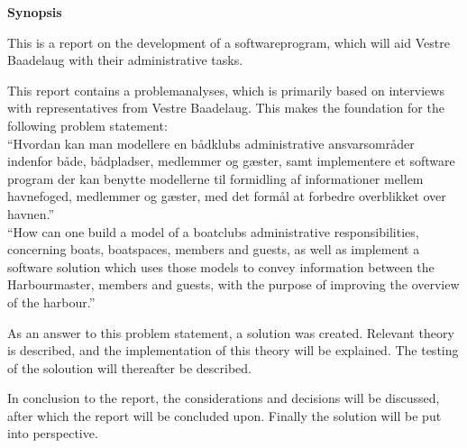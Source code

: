\begin{center}\textbf{Synopsis}\\ \end{center}

This is a report on the development of a softwareprogram, which will aid Vestre Baadelaug with their administrative tasks.

This report contains a problemanalyses, which is primarily based on interviews with representatives from Vestre Baadelaug. This makes the foundation for the following problem statement:\\

\enquote{Hvordan kan man modellere en bådklubs administrative ansvarsområder indenfor både, bådpladser, medlemmer og gæster, samt implementere et software program der kan benytte modellerne til formidling af informationer mellem havnefoged, medlemmer og gæster, med det formål at forbedre overblikket over havnen.}\\

\enquote{How can one build a model of a boatclubs administrative responsibilities, concerning boats, boatspaces, members and guests, as well as implement a software solution which uses those models to convey information between the Harbourmaster, members and guests, with the purpose of improving the overview of the harbour.}

As an answer to this problem statement, a solution was created. Relevant theory is described, and the implementation of this theory will be explained. The testing of the soloution will thereafter be described.

In conclusion to the report, the considerations and decisions will be discussed, after which the report will be concluded upon. Finally the solution will be put into perspective.